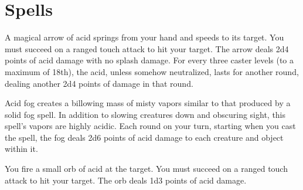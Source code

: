 \section{Spells}

\begin{multicols}{2}
\begin{small}

\noindent A magical arrow of acid springs from your hand and speeds to its target. You must succeed on a ranged touch attack to hit your target. The arrow deals 2d4 points of acid damage with no splash damage. For every three caster levels (to a maximum of 18th), the acid, unless somehow neutralized, lasts for another round, dealing another 2d4 points of damage in that round.


\noindent Acid fog creates a billowing mass of misty vapors similar to that produced by a solid fog spell. In addition to slowing creatures down and obscuring sight, this spell's vapors are highly acidic. Each round on your turn, starting when you cast the spell, the fog deals 2d6 points of acid damage to each creature and object within it.


\noindent You fire a small orb of acid at the target. You must succeed on a ranged touch attack to hit your target. The orb deals 1d3 points of acid damage.


\end{small}
\end{multicols}
